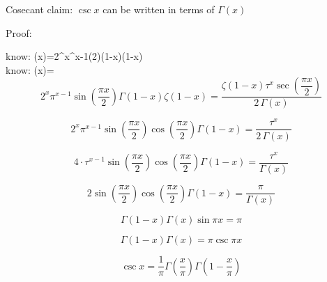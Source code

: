 \documentclass[12pt]{article}
\begin{document}
\pagebreak
\begin{section}{Cosecant}
	claim: $\csc x$ can be written in terms of $\Gamma(x)$

	\noindent Proof:

	\noindent know: \zeta(x)=2^x\pi^{x-1}\sin\left(2\right)\Gamma(1-x)\zeta(1-x)\\
	
	\noindent know: \zeta(x)=\\

	\begin{equation}
		2^x\pi^{x-1}\sin\left(\dfrac{\pi x}2\right)\Gamma(1-x)\zeta(1-x)=\dfrac{\zeta(1-x)\tau^x\sec\left(\dfrac{\pi x}2\right)}{2\,\Gamma(x)}
	\end{equation}

	\begin{equation}
		2^x\pi^{x-1}\sin\left(\dfrac{\pi x}2\right)\cos\left(\dfrac{\pi x}2\right)\Gamma(1-x)=\dfrac{\tau^x}{2\,\Gamma(x)}
	\end{equation}

	\begin{equation}
		4\cdot\tau^{x-1}\sin\left(\dfrac{\pi x}2\right)\cos\left(\dfrac{\pi x}2\right)\Gamma(1-x)=\dfrac{\tau^x}{\Gamma(x)}
	\end{equation}

	\begin{equation}
		2\sin\left(\dfrac{\pi x}2\right)\cos\left(\dfrac{\pi x}2\right)\Gamma(1-x)=\dfrac{\pi}{\Gamma(x)}
	\end{equation}

	\begin{equation}
		\Gamma(1-x)\Gamma(x)\sin\pi x=\pi
	\end{equation}

	\begin{equation}
		\Gamma(1-x)\Gamma(x)=\pi\csc\pi x
	\end{equation}

	\begin{equation}
		\csc x=\dfrac1\pi\Gamma\left(\dfrac x\pi\right)\Gamma\left(1-\dfrac x\pi\right)
	\end{equation}

	\noindent\blacksquare
\end{section}
\end{document}
